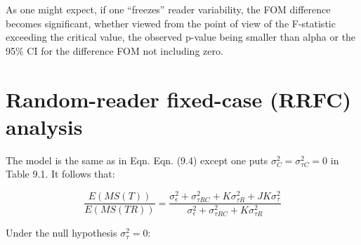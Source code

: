 \documentclass[
]{book}
\newenvironment{Shaded}{\begin{snugshade}}{\end{snugshade}}
\newcommand{\CommentTok}[1]{\textcolor[rgb]{0.56,0.35,0.01}{\textit{#1}}}
\newcommand{\DecValTok}[1]{\textcolor[rgb]{0.00,0.00,0.81}{#1}}
\newcommand{\KeywordTok}[1]{\textcolor[rgb]{0.13,0.29,0.53}{\textbf{#1}}}
\newcommand{\NormalTok}[1]{#1}
\newcommand{\OperatorTok}[1]{\textcolor[rgb]{0.81,0.36,0.00}{\textbf{#1}}}
\newcommand{\StringTok}[1]{\textcolor[rgb]{0.31,0.60,0.02}{#1}}
\begin{document}
\begin{Shaded}
\end{Shaded}

As one might expect, if one ``freezes'' reader variability, the FOM difference becomes significant, whether viewed from the point of view of the F-statistic exceeding the critical value, the observed p-value being smaller than alpha or the 95\% CI for the difference FOM not including zero.

\hypertarget{random-reader-fixed-case-rrfc-analysis}{%
\section{Random-reader fixed-case (RRFC) analysis}\label{random-reader-fixed-case-rrfc-analysis}}

The model is the same as in Eqn. Eqn. (9.4) except one puts \(\sigma_C^2 = \sigma_{\tau C}^2 =0\) in Table 9.1. It follows that:

\begin{equation}
\frac{E(MS(T))}{E(MS(TR))}=\frac{\sigma_\epsilon^2+\sigma_{\tau RC}^2+K\sigma_{\tau R}^2+JK\sigma_{\tau}^2}{\sigma_\epsilon^2+\sigma_{\tau RC}^2+K\sigma_{\tau R}^2}
\end{equation}

Under the null hypothesis \(\sigma_\tau^2 = 0\):
\end{document}

